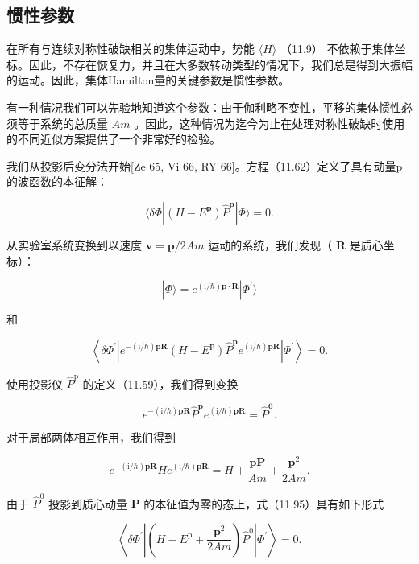 \subsection{惯性参数}

在所有与连续对称性破缺相关的集体运动中，势能 $\langle H\rangle$ （11.9） 不依赖于集体坐标。因此，不存在恢复力，并且在大多数转动类型的情况下，我们总是得到大振幅的运动。因此，集体Hamilton量的关键参数是惯性参数。

有一种情况我们可以先验地知道这个参数：由于伽利略不变性，平移的集体惯性必须等于系统的总质量 ${Am}$ 。因此，这种情况为迄今为止在处理对称性破缺时使用的不同近似方案提供了一个非常好的检验。

我们从投影后变分法开始{[}Ze 65, Vi 66, RY 66{]}。方程（11.62）定义了具有动量p的波函数的本征解：

\[
\langle{\delta\Phi}\left|{\left({H-{E}^{\boldsymbol{p}}}\right){\widehat{P}}^{\boldsymbol{p}}}\right|\Phi\rangle=0.\tag{11.93}
\]

从实验室系统变换到以速度 $\boldsymbol{v}=\boldsymbol{p}/{2Am}$ 运动的系统，我们发现（ $\boldsymbol{R}$
是质心坐标）：

\[
|\Phi\rangle={e}^{(\mathrm{i}/\hbar)\boldsymbol{p}\cdot\boldsymbol{R}}|{\Phi}^{\prime}\rangle\tag{11.94}
\]

和

\[
\left\langle {\delta{\Phi}^{\prime}\left|{{e}^{-\left({\mathrm{i}/\hbar}\right)\boldsymbol{p}\boldsymbol{R}}\left({H-{E}^{\boldsymbol{p}}}\right){\widehat{P}}^{\boldsymbol{p}}{e}^{\left({\mathrm{i}/\hbar}\right)\boldsymbol{p}\boldsymbol{R}}}\right|{\Phi}^{\prime}}\right\rangle =0.\tag{11.95}
\]

使用投影仪 ${\widehat{P}}^{\mathrm{p}}$ 的定义（11.59），我们得到变换

\[
{e}^{-\left({\mathrm{i}/\hbar}\right)\boldsymbol{p}\boldsymbol{R}}{\widehat{P}}^{\boldsymbol{p}}{e}^{\left({\mathrm{i}/\hbar}\right)\boldsymbol{p}\boldsymbol{R}}={\widehat{P}}^{\boldsymbol{0}}.\tag{11.96}
\]

对于局部两体相互作用，我们得到

\[
{e}^{-\left({\mathrm{i}/\hbar}\right)\boldsymbol{p}\boldsymbol{R}}H{e}^{\left({\mathrm{i}/\hbar}\right)\boldsymbol{p}\boldsymbol{R}}=H+\frac{\boldsymbol{{pP}}}{Am}+\frac{{\boldsymbol{p}}^{2}}{2Am}.\tag{11.97}
\]

由于 ${\widehat{P}}^{0}$ 投影到质心动量 $\boldsymbol{P}$ 的本征值为零的态上，式（11.95）具有如下形式

\[
\left\langle {\delta{\Phi}^{\prime}\left|{\left({H-{E}^{\mathrm{p}}+\frac{{\boldsymbol{p}}^{2}}{2Am}}\right){\widehat{P}}^{0}}\right|{\Phi}^{\prime}}\right\rangle =0.\tag{11.98}
\]


